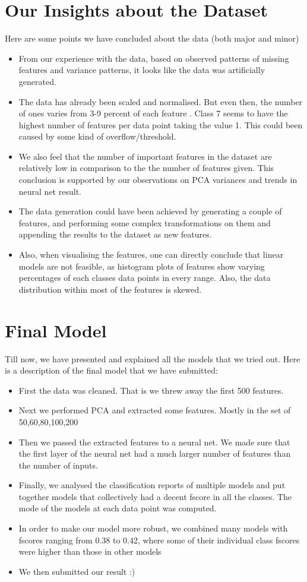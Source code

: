 \documentclass[12pt]{report}
\begin{document}
\section{Our Insights about the Dataset }
Here are some points we have concluded about the data (both major and minor)
\begin{itemize}
    \item From our experience with the data, based on observed patterns of missing features and variance patterns, it looks like the data was artificially generated.
    \item The data has already been scaled and normalised. But even then, the number of ones varies from 3-9 percent of each feature . Class 7 seems to have the highest number of features per data point taking the value 1. This could been caused by some kind of overflow/threshold.
    \item We also feel that the number of important features in the dataset are relatively low in comparison to the the number of features given. This conclusion is supported by our observations on PCA variances and trends in neural net result.
    \item The data generation could have been achieved by generating a couple of features, and performing some complex transformations on them and appending the results to the dataset as new features. 
    \item Also, when visualising the features, one can directly conclude that linear models are not feasible, as histogram plots of features show varying percentages of each classes data points in every range. Also, the data distribution within most of the features is skewed.
\end{itemize}


\newpage  
\section{Final Model}

Till now, we have presented and explained all the models that we tried out. Here is a description of the final model that we have submitted:
\begin{itemize}
    \item First the data was cleaned. That is we threw away the first 500 features.
    \item Next we performed PCA and extracted some features. Mostly in the set of {50,60,80,100,200}
    \item Then we passed the extracted features to a neural net. We made sure that the first layer of the neural net had a much larger number of features than the number of inputs.
    \item Finally, we analysed the classification reports of multiple models and put together models that collectively had a decent fscore in all the classes. The mode of the models at each data point was computed.
    \item In order to make our model more robust, we combined many models with fscores ranging from 0.38 to 0.42, where some of their individual class fscores were higher than those in other models 
    \item We then submitted our result :)
\end{itemize}
\end{document}
